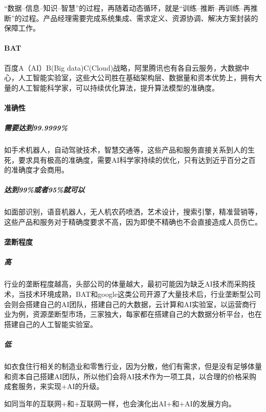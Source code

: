 \documentclass[letterpaper,10pt,english]{sphinxmanual}
\begin{document}
“数据–信息–知识–智慧”的过程，再随着动态循环，就是“训练–推断–再训练–再推断”的过程。产品经理需要完成系统集成、需求定义、资源协调、解决方案封装的保障工作。


\paragraph{BAT}
\label{\detokenize{chapter_project/AI_industry_analysis:bat}}
百度A（AI）B(Big
data)C(Cloud)战略，阿里腾讯也有各自云服务，大数据中心，人工智能实验室，这些大公司胜在基础架构层、数据量和资本优势上，拥有大量的人工智能科学家，可以持续优化算法，提升算法模型的准确度。


\paragraph{准确性}
\label{\detokenize{chapter_project/AI_industry_analysis:id15}}

\subparagraph{需要达到99.9999\%}
\label{\detokenize{chapter_project/AI_industry_analysis:id16}}
如手术机器人，自动驾驶技术，智慧交通等，这些产品和服务直接关系到人的生死，要求具有极高的准确度，需要AI科学家持续的优化，只有达到近乎百分之百的准确度才会商用。


\subparagraph{达到99\%或者95\%就可以}
\label{\detokenize{chapter_project/AI_industry_analysis:id17}}
如面部识别，语音机器人，无人机农药喷洒，艺术设计，搜索引擎，精准营销等，这些产品和服务对于精确度要求不高，因为即使不精确也不会直接造成人员伤亡。


\paragraph{垄断程度}
\label{\detokenize{chapter_project/AI_industry_analysis:id18}}

\subparagraph{高}
\label{\detokenize{chapter_project/AI_industry_analysis:id19}}
行业的垄断程度越高，头部公司的体量越大，最初可能因为缺乏AI技术而采购技术，当技术环境成熟，BAT和google这类公司开源了大量技术后，行业垄断型公司会则会搭建自己的AI团队，搭建自己的大数据，云计算和AI实验室，以运营商行业为例，资源垄断型市场，三家独大，每家都在搭建自己的大数据分析平台，也在搭建自己的人工智能实验室。


\subparagraph{低}
\label{\detokenize{chapter_project/AI_industry_analysis:id20}}
如衣食住行相关的制造业和零售行业，因为分散，他们有需求，但是没有足够体量和资本自己搭建AI团队，所以他们会将AI技术作为一项工具，以合理的价格采购成套服务，来实现+AI的升级。

如同当年的互联网+和+互联网一样，也会演化出AI+和+AI的发展方向。
\end{document}
